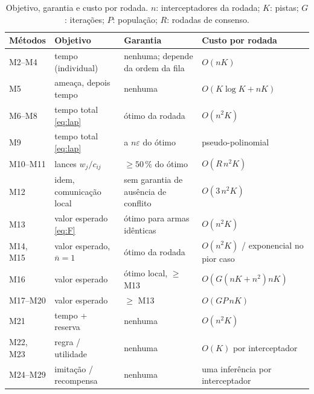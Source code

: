 \begin{table}[t]
\centering
\caption{Objetivo, garantia e custo por rodada. $n$: interceptadores da rodada; $K$: pistas; $G$: iterações; $P$: população;
$R$: rodadas de consenso.}
\label{tab:metodos}
\small
\begin{tabularx}{\textwidth}{@{}l l X l@{}}
\toprule
Métodos & Objetivo & Garantia & Custo por rodada \\
\midrule
M2--M4 & tempo (individual) & nenhuma; depende da ordem da fila & $O(nK)$ \\
M5 & ameaça, depois tempo & nenhuma & $O(K\log K+nK)$ \\
M6--M8 & tempo total \eqref{eq:lap} & ótimo da rodada & $O(n^2K)$ \\
M9 & tempo total \eqref{eq:lap} & a $n\varepsilon$ do ótimo & pseudo-polinomial \\
M10--M11 & lances $w_j/c_{ij}$ & $\ge50\,\%$ do ótimo~\cite{choi2009} & $O(R\,n^2K)$ \\
M12 & idem, comunicação local & sem garantia de ausência de conflito & $O(3\,n^2K)$ \\
M13 & valor esperado \eqref{eq:F} & ótimo para armas idênticas & $O(n^2K)$ \\
M14, M15 & valor esperado, $\bar n=1$ & ótimo da rodada & $O(n^2K)$ / exponencial no pior caso \\
M16 & valor esperado & ótimo local, $\ge$ M13 & $O(G(nK+n^2)nK)$ \\
M17--M20 & valor esperado & $\ge$ M13 & $O(GP\,nK)$ \\
M21 & tempo + reserva & nenhuma & $O(n^2K)$ \\
M22, M23 & regra / utilidade & nenhuma & $O(K)$ por interceptador \\
M24--M29 & imitação / recompensa & nenhuma & uma inferência por interceptador \\
\bottomrule
\end{tabularx}
\end{table}
